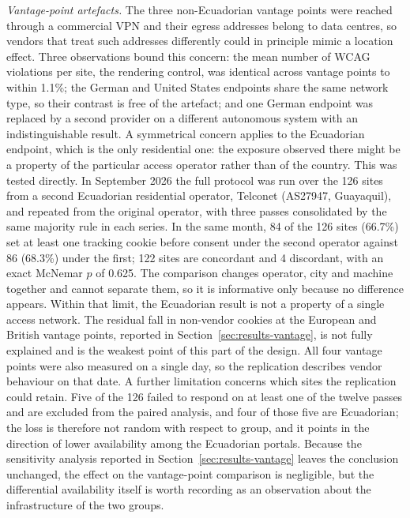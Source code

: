 \documentclass[pdflatex,sn-basic,Numbered,iicol]{sn-jnl}
\theoremstyle{thmstyleone}
\theoremstyle{thmstyletwo}
\theoremstyle{thmstylethree}
\begin{document}
\emph{Vantage-point artefacts.} The three non-Ecuadorian vantage points were reached through a commercial VPN and their egress addresses belong to data centres, so vendors that treat such addresses differently could in principle mimic a location effect. Three observations bound this concern: the mean number of WCAG violations per site, the rendering control, was identical across vantage points to within 1.1\%; the German and United States endpoints share the same network type, so their contrast is free of the artefact; and one German endpoint was replaced by a second provider on a different autonomous system with an indistinguishable result. A symmetrical concern applies to the Ecuadorian endpoint, which is the only residential one: the exposure observed there might be a property of the particular access operator rather than of the country. This was tested directly. In September 2026 the full protocol was run over the 126 sites from a second Ecuadorian residential operator, Telconet (AS27947, Guayaquil), and repeated from the original operator, with three passes consolidated by the same majority rule in each series. In the same month, 84 of the 126 sites (66.7\%) set at least one tracking cookie before consent under the second operator against 86 (68.3\%) under the first; 122 sites are concordant and 4 discordant, with an exact McNemar $p$ of 0.625. The comparison changes operator, city and machine together and cannot separate them, so it is informative only because no difference appears. Within that limit, the Ecuadorian result is not a property of a single access network. The residual fall in non-vendor cookies at the European and British vantage points, reported in Section~\ref{sec:results-vantage}, is not fully explained and is the weakest point of this part of the design. All four vantage points were also measured on a single day, so the replication describes vendor behaviour on that date. A further limitation concerns which sites the replication could retain. Five of the 126 failed to respond on at least one of the twelve passes and are excluded from the paired analysis, and four of those five are Ecuadorian; the loss is therefore not random with respect to group, and it points in the direction of lower availability among the Ecuadorian portals. Because the sensitivity analysis reported in Section~\ref{sec:results-vantage} leaves the conclusion unchanged, the effect on the vantage-point comparison is negligible, but the differential availability itself is worth recording as an observation about the infrastructure of the two groups.
\end{document}
